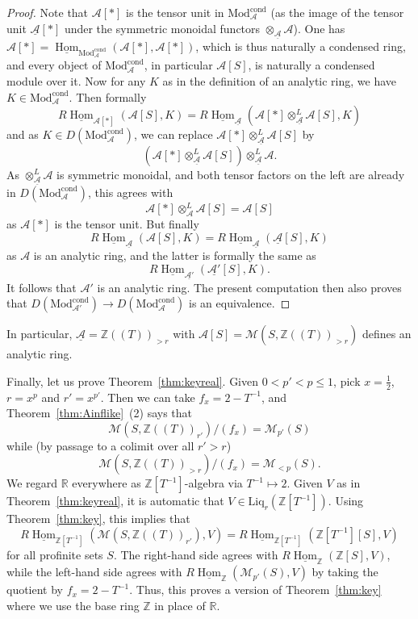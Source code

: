 \documentclass[11pt]{amsbook}
\DeclareMathOperator{\Hom}{Hom}
\newcommand{\intHom}{\underline{\Hom}}
\newcommand{\CondMod}{\mathrm{Mod}^{\mathrm{cond}}}
\numberwithin{equation}{section}
\numberwithin{theorem}{section}
\theoremstyle{definition}
\begin{document}
\begin{proof} Note that $\mathcal A[\ast]$ is the tensor unit in $\CondMod_{\mathcal A}$ (as the image of the tensor unit $\underline{\mathcal A}[\ast]$ under the symmetric monoidal functors $\otimes_{\underline{\mathcal A}} \mathcal A$). One has $\mathcal A[\ast] = \intHom_{\CondMod_{\mathcal A}}(\mathcal A[\ast],\mathcal A[\ast])$, which is thus naturally a condensed ring, and every object of $\CondMod_{\mathcal A}$, in particular $\mathcal A[S]$, is naturally a condensed module over it. Now for any $K$ as in the definition of an analytic ring, we have $K\in \CondMod_{\mathcal A}$. Then formally
\[
R\intHom_{\mathcal A[\ast]}(\mathcal A[S],K) = R\intHom_{\underline{\mathcal A}}(\mathcal A[\ast]\otimes^L_{\underline{\mathcal A}} \mathcal A[S],K)
\]
and as $K\in D(\CondMod_{\mathcal A})$, we can replace $\mathcal A[\ast]\otimes^L_{\underline{\mathcal A}} \mathcal A[S]$ by
\[
(\mathcal A[\ast]\otimes^L_{\underline{\mathcal A}} \mathcal A[S])\otimes^L_{\underline{\mathcal A}} \mathcal A.
\]
As $\otimes^L_{\underline{\mathcal A}} \mathcal A$ is symmetric monoidal, and both tensor factors on the left are already in $D(\CondMod_{\mathcal A})$, this agrees with
\[
\mathcal A[\ast]\otimes^L_{\mathcal A} \mathcal A[S] = \mathcal A[S]
\]
as $\mathcal A[\ast]$ is the tensor unit. But finally
\[
R\intHom_{\underline{\mathcal A}}(\mathcal A[S],K) = R\intHom_{\underline{\mathcal A}}(\underline{\mathcal A}[S],K)
\]
as $\mathcal A$ is an analytic ring, and the latter is formally the same as
\[
R\intHom_{\underline{\mathcal A'}}(\underline{\mathcal A'}[S],K).
\]
It follows that $\mathcal A'$ is an analytic ring. The present computation then also proves that $D(\CondMod_{\mathcal A'})\to D(\CondMod_{\mathcal A})$ is an equivalence.
\end{proof}

In particular, $\underline{\mathcal A}=\mathbb Z((T))_{>r}$ with $\mathcal A[S] = \mathcal M(S,\mathbb Z((T))_{>r})$ defines an analytic ring.

Finally, let us prove Theorem~\ref{thm:keyreal}. Given $0<p'<p\leq 1$, pick $x=\tfrac 12$, $r=x^p$ and $r'=x^{p'}$. Then we can take $f_x=2-T^{-1}$, and Theorem~\ref{thm:Ainflike}~(2) says that
\[
\mathcal M(S,\mathbb Z((T))_{r'})/(f_x)=\mathcal M_{p'}(S)
\]
while (by passage to a colimit over all $r'>r$)
\[
\mathcal M(S,\mathbb Z((T))_{>r})/(f_x) = \mathcal M_{<p}(S).
\]
We regard $\mathbb R$ everywhere as $\mathbb Z[T^{-1}]$-algebra via $T^{-1}\mapsto 2$. Given $V$ as in Theorem~\ref{thm:keyreal}, it is automatic that $V\in \mathrm{Liq}_r(\mathbb Z[T^{-1}])$. Using Theorem~\ref{thm:key}, this implies that
\[
R\intHom_{\mathbb Z[T^{-1}]}(\mathcal M(S,\mathbb Z((T))_{r'}),V) = R\intHom_{\mathbb Z[T^{-1}]}(\mathbb Z[T^{-1}][S],V)
\]
for all profinite sets $S$. The right-hand side agrees with $R\intHom_{\mathbb Z}(\mathbb Z[S],V)$, while the left-hand side agrees with $R\intHom_{\mathbb Z}(\mathcal M_{p'}(S),V)$ by taking the quotient by $f_x=2-T^{-1}$. Thus, this proves a version of Theorem~\ref{thm:key} where we use the base ring $\mathbb Z$ in place of $\mathbb R$.
\end{document}
